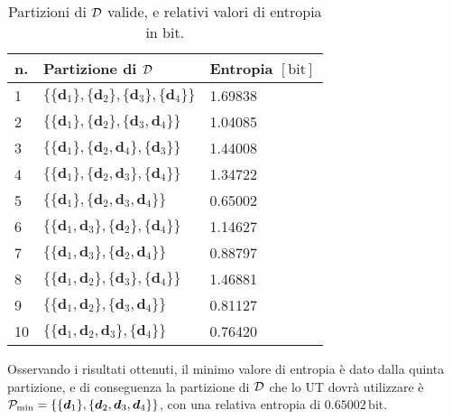\begin{table}[ht]
    \centering
    \renewcommand{\arraystretch}{1.4}
    \begin{tabular}{lll}
        \toprule
        n. & Partizione di \(\mathcal{D}\) & Entropia \([\mathrm{bit}]\)\\
        \midrule
        1 & \(\{ \{\bm{d}_1\}, \{\bm{d}_2\}, \{\bm{d}_3\}, \{\bm{d}_4\} \}\) & 1.69838 \\
        2 & \(\{ \{\bm{d}_1\}, \{\bm{d}_2\}, \{\bm{d}_3, \bm{d}_4\} \}\) & 1.04085 \\
        3 & \(\{ \{\bm{d}_1\}, \{\bm{d}_2, \bm{d}_4\}, \{\bm{d}_3\} \}\) & 1.44008 \\
        4 & \(\{ \{\bm{d}_1\}, \{\bm{d}_2, \bm{d}_3\}, \{\bm{d}_4\} \}\) & 1.34722 \\
        5 & \(\{ \{\bm{d}_1\}, \{\bm{d}_2, \bm{d}_3, \bm{d}_4\} \}\) & 0.65002 \\
        6 & \(\{ \{\bm{d}_1, \bm{d}_3\}, \{\bm{d}_2\}, \{\bm{d}_4\} \}\) & 1.14627 \\
        7 & \(\{ \{\bm{d}_1, \bm{d}_3\}, \{\bm{d}_2, \bm{d}_4\} \}\) & 0.88797 \\
        8 & \(\{ \{\bm{d}_1, \bm{d}_2\}, \{\bm{d}_3\}, \{\bm{d}_4\} \}\) & 1.46881 \\
        9 & \(\{ \{\bm{d}_1, \bm{d}_2\}, \{\bm{d}_3, \bm{d}_4\} \}\) & 0.81127 \\
        10 & \(\{ \{\bm{d}_1, \bm{d}_2, \bm{d}_3\}, \{\bm{d}_4\} \}\) & 0.76420 \\
        \bottomrule
    \end{tabular}
    \caption{Partizioni di $\mathcal{D}$ valide, e relativi valori di entropia in
    $\mathrm{bit}$.}
    \label{tab:apx-partitions-of-d}
\end{table}
\newline
Osservando i risultati ottenuti, il minimo valore di entropia è dato dalla
quinta partizione, e di conseguenza la partizione di \(\mathcal{D}\) che lo UT
dovrà utilizzare è \(\mathcal{P}_\mathrm{min} = \{ \{\bm{d}_1\}, \{\bm{d}_2,
\bm{d}_3, \bm{d}_4\} \}\), con una relativa entropia di
$0.65002\,\mathrm{bit}$.

